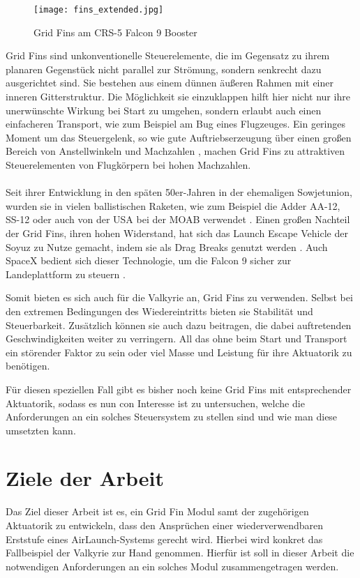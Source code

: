 \begin{figure}[h]
	\centering
	\texttt{[image: fins\_extended.jpg]}
	\caption{Grid Fins am CRS-5 Falcon 9 Booster}
	\label{abb_f9_GF}
\end{figure}

Grid Fins sind unkonventionelle Steuerelemente, die im Gegensatz zu ihrem planaren Gegenstück nicht parallel zur Strömung, sondern senkrecht dazu ausgerichtet sind. Sie bestehen aus einem dünnen äußeren Rahmen mit einer inneren Gitterstruktur. Die Möglichkeit sie einzuklappen hilft hier nicht nur ihre unerwünschte Wirkung bei Start zu umgehen, sondern erlaubt auch einen einfacheren Transport, wie zum Beispiel am Bug eines Flugzeuges. Ein geringes Moment um das Steuergelenk, so wie gute Auftriebserzeugung über einen großen Bereich von Anstellwinkeln und Machzahlen \cite{vergleichPlanar}, machen Grid Fins zu attraktiven Steuerelementen von Flugkörpern bei hohen Machzahlen.
\\~\\
Seit ihrer Entwicklung in den späten 50er-Jahren in der ehemaligen Sowjetunion, wurden sie in vielen ballistischen Raketen, wie zum Beispiel die Adder AA-12, SS-12 oder auch von der USA bei der \gls{MOAB} verwendet \cite{sehnenlaenge}. Einen großen Nachteil der Grid Fins, ihren hohen Widerstand, hat sich das Launch Escape Vehicle der Soyuz zu Nutze gemacht, indem sie als Drag Breaks genutzt werden \cite{sehnenlaenge}. Auch SpaceX bedient sich dieser Technologie, um die Falcon 9 sicher zur Landeplattform zu steuern \cite{sehnenlaenge}.

Somit bieten es sich auch für die Valkyrie an, Grid Fins zu verwenden. Selbst bei den extremen Bedingungen des Wiedereintritts bieten sie Stabilität und Steuerbarkeit. Zusätzlich können sie auch dazu beitragen, die dabei auftretenden Geschwindigkeiten weiter zu verringern. All das ohne beim Start und Transport ein störender Faktor zu sein oder viel Masse und Leistung für ihre Aktuatorik zu benötigen.

Für diesen speziellen Fall gibt es bisher noch keine Grid Fins mit entsprechender Aktuatorik, sodass es nun con Interesse ist zu untersuchen, welche die Anforderungen an ein solches Steuersystem zu stellen sind und wie man diese umsetzten kann.

\section{Ziele der Arbeit}
Das Ziel dieser Arbeit ist es, ein Grid Fin Modul samt der zugehörigen Aktuatorik zu entwickeln, dass den Ansprüchen einer wiederverwendbaren Erststufe eines AirLaunch-Systems gerecht wird. Hierbei wird konkret das Fallbeispiel der Valkyrie zur Hand genommen.
Hierfür ist soll in dieser Arbeit die notwendigen Anforderungen an ein solches Modul zusammengetragen werden.

